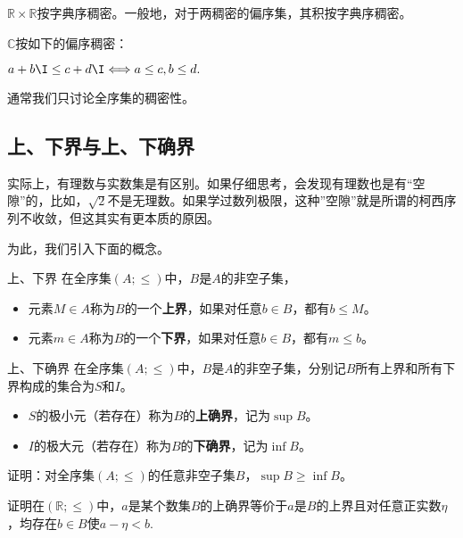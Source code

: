 \begin{example}{}
$\mathbb{R}\times\mathbb{R}$按字典序稠密。一般地，对于两稠密的偏序集，其积按字典序稠密。
\end{example}

\begin{example}{}
$\mathbb{C}$按如下的偏序稠密：

$a+b\I\leq c+d\I\Longleftrightarrow a\leq c,b\leq d.$

通常我们只讨论全序集的稠密性。
\end{example}

\subsection{上、下界与上、下确界}

实际上，有理数与实数集是有区别。如果仔细思考，会发现有理数也是有“空隙”的，比如，$\sqrt{2}$不是无理数。如果学过数列极限，这种”空隙”就是所谓的柯西序列不收敛，但这其实有更本质的原因。

为此，我们引入下面的概念。

\begin{definition}{上、下界}
在全序集$(A;\leq)$中，$B$是$A$的非空子集，
\begin{itemize}
\item 元素$M\in A$称为$B$的一个\textbf{上界}，如果对任意$b\in B$，都有$b\leq M$。
\item 元素$m\in A$称为$B$的一个\textbf{下界}，如果对任意$b\in B$，都有$m\leq b$。
\end{itemize}
\end{definition}

\begin{definition}{上、下确界}
在全序集$(A;\leq)$中，$B$是$A$的非空子集，分别记$B$所有上界和所有下界构成的集合为$S$和$I$。
\begin{itemize}
\item $S$的极小元（若存在）称为$B$的\textbf{上确界}，记为$\sup B$。
\item $I$的极大元（若存在）称为$B$的\textbf{下确界}，记为$\inf B$。
\end{itemize}
\end{definition}
\begin{exercise}{}
证明：对全序集$(A;\leq)$的任意非空子集$B$，$\sup B\geq\inf B$。
\end{exercise}
\begin{exercise}{}
证明在$(\mathbb{R};\leq)$中，$a$是某个数集$B$的上确界等价于$a$是$B$的上界且对任意正实数$\eta$，均存在$b\in B$使$a-\eta<b$.
\end{exercise}
